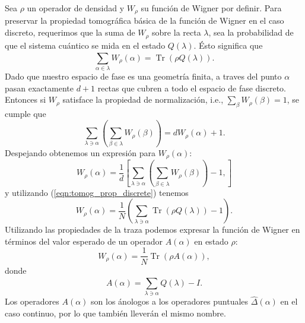 \documentclass[a4paper]{report}
\DeclareMathOperator{\Tr}{Tr}
\begin{document}
  Sea $\rho$ un operador de densidad y $W_\rho$ su función
  de Wigner por definir. Para preservar la propiedad
  tomográfica básica de la función de Wigner en el caso
  discreto, requerimos que la suma de $W_\rho$ sobre la
  recta $\lambda$, sea la probabilidad de que el sistema
  cuántico se mida en el estado $Q(\lambda)$. Ésto significa
  que 
  \begin{equation}
    \label{eqn:tomog_prop_discrete}
    \sum_{\alpha \in \lambda}^{} W_\rho(\alpha)
    = \Tr\left( \rho Q(\lambda) \right).
  \end{equation}
  Dado que nuestro espacio de fase es una geometría finita,
  a traves del punto $\alpha$ pasan exactamente $d+1$
  rectas que cubren a todo el espacio de fase discreto.
  Entonces si $W_\rho$ satisface la propiedad de
  normalización, i.e., $\sum_\beta W_\rho(\beta) = 1$, se
  cumple que
  \begin{equation}
    \sum_{\lambda \ni \alpha}^{}
    \left( \sum_{\beta \in \lambda}^{} W_\rho(\beta) \right) 
    = d W_\rho(\alpha) + 1.
  \end{equation}
  Despejando obtenemos un expresión para $W_\rho(\alpha)$:
  \[
    W_\rho(\alpha)
    = \frac{1}{d}
    \left[
      \sum_{\lambda \ni \alpha}^{}
      \left(
        \sum_{\beta \in \lambda}^{} W_\rho(\beta)
      \right) - 1,
    \right]
  \] 
  y utilizando (\ref{eqn:tomog_prop_discrete}) tenemos
  \begin{equation}
    W_\rho(\alpha)
    = \frac{1}{N} \left( \sum_{\lambda \ni \alpha}^{}
    \Tr\left( \rho Q(\lambda) \right) - 1 \right).
  \end{equation}
  Utilizando las propiedades de la traza podemos expresar
  la función de Wigner en términos del valor esperado de un
  operador $A(\alpha)$ en estado $\rho$:
  \begin{equation}
    \label{eqn:discrete_wigner}
    W_\rho(\alpha)
    = \frac{1}{N} \Tr\left( \rho A(\alpha) \right),
  \end{equation} 
  donde 
  \begin{equation}
    \label{eqn:discrete_point_op}
    A(\alpha)
    = \sum_{\lambda \ni \alpha}^{} Q(\lambda) - I.
  \end{equation} 
  Los operadores $A(\alpha)$ son los ánologos a los
  operadores puntuales $\hat \Delta(\alpha)$ en el caso
  continuo, por lo que también lleverán el mismo nombre.
\end{document}
